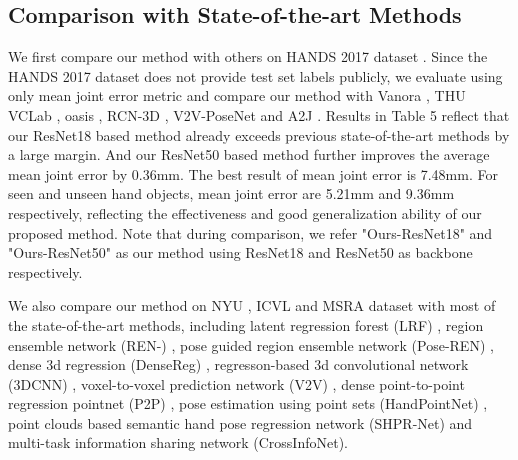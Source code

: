 \documentclass[letterpaper]{article} \usepackage{aaai20}  \usepackage{times}  \usepackage{helvet} \usepackage{courier}  \usepackage[hyphens]{url}  \usepackage{graphicx} \usepackage{amsmath}
\begin{document}
\subsection{Comparison with State-of-the-art Methods}

We first compare our method with others on HANDS 2017 dataset \cite{hands17}. Since the HANDS 2017 dataset does not provide test set labels publicly, we evaluate using only mean joint error metric and compare our method with Vanora \cite{vanora}, THU VCLab \cite{pose}, oasis \cite{handpointnet}, RCN-3D \cite{vanora}, V2V-PoseNet \cite{v2v} and A2J \cite{a2j}. Results in Table 5 reflect that our ResNet18 based method already exceeds previous state-of-the-art methods by a large margin. And our ResNet50 based method further improves the average mean joint error by 0.36mm. The best result of mean joint error is 7.48mm. For seen and unseen hand objects, mean joint error are 5.21mm and 9.36mm respectively, reflecting the effectiveness and good generalization ability of our proposed method. Note that during comparison, we refer "Ours-ResNet18" and "Ours-ResNet50" as our method using ResNet18 and ResNet50 as backbone respectively.  

We also compare our method on NYU \cite{nyu}, ICVL \cite{icvl} and MSRA \cite{offset2} dataset with most of the state-of-the-art methods, including latent regression forest (LRF) \cite{lrf}, region ensemble network (REN-) \cite{ren}, pose guided region ensemble network (Pose-REN) \cite{pose}, dense 3d regression (DenseReg) \cite{dense3d}, regresson-based 3d convolutional network (3DCNN) \cite{3dcnn}, voxel-to-voxel prediction network (V2V) \cite{v2v}, dense point-to-point regression pointnet (P2P) \cite{p2p}, pose estimation using point sets (HandPointNet) \cite{handpointnet}, point clouds based semantic hand pose regression network (SHPR-Net) \cite{shpr} and multi-task information sharing network (CrossInfoNet)\cite{crossinfonet}. 
\end{document}
